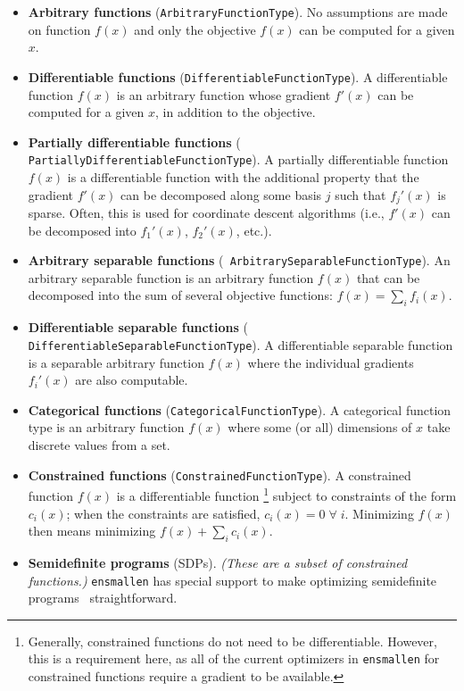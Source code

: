 \begin{itemize}
\item {\bf Arbitrary functions} ({\tt ArbitraryFunctionType}).
No assumptions are made on function $f(x)$ and only the objective
$f(x)$ can be computed for a given $x$.

\item {\bf Differentiable functions} ({\tt DifferentiableFunctionType}).
A differentiable function $f(x)$ is an arbitrary function whose gradient $f'(x)$
can be computed for a given $x$, in addition to the objective.

\item {\bf Partially differentiable functions} ({\tt
PartiallyDifferentiableFunctionType}).  A partially differentiable function
$f(x)$ is a differentiable function with the additional property that the
gradient $f'(x)$ can be decomposed along some basis $j$ such that $f_j'(x)$ is
sparse.  Often, this is used for coordinate descent algorithms (i.e., $f'(x)$
can be decomposed into $f_{1}'(x)$, $f_{2}'(x)$, etc.).

\item {\bf Arbitrary separable functions} ({\tt
ArbitrarySeparableFunctionType}).  An arbitrary separable function is an
arbitrary function $f(x)$ that can be decomposed into the sum of several
objective functions: $f(x) = \sum\nolimits_i f_i(x)$.

\item {\bf Differentiable separable functions} ({\tt
DifferentiableSeparableFunctionType}).  A differentiable separable function is a
separable arbitrary function $f(x)$ where the individual gradients $f_i'(x)$ are
also computable.

\item {\bf Categorical functions} ({\tt CategoricalFunctionType}).  A
categorical function type is an arbitrary function $f(x)$ where some (or all)
dimensions of $x$ take discrete values from a set.

\item {\bf Constrained functions} ({\tt ConstrainedFunctionType}).
A constrained function $f(x)$ is a differentiable function%
\footnote{Generally, constrained functions  do not need to be differentiable.
However, this is a requirement here, as all of the current optimizers in {\tt ensmallen}
for constrained functions require a gradient to be available.}
subject to constraints of the form $c_i(x)$; when the constraints are satisfied, $c_i(x) = 0\; \forall \; i$.
Minimizing $f(x)$ then means minimizing $f(x) + \sum_i c_i(x)$.

\item {\bf Semidefinite programs} (SDPs).  {\it (These are a subset of
constrained functions.)}  {\tt ensmallen} has special
support to make optimizing semidefinite
programs~\cite{vandenberghe1996semidefinite} straightforward.
\end{itemize}

